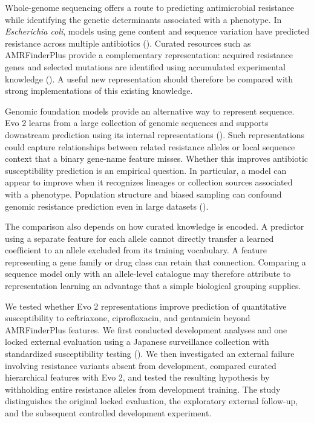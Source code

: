 \documentclass[
  american,
  11pt,
]{article}
\begin{document}
Whole-genome sequencing offers a route to predicting antimicrobial
resistance while identifying the genetic determinants associated with a
phenotype. In \emph{Escherichia coli}, models using gene content and
sequence variation have predicted resistance across multiple antibiotics
(). Curated
resources such as AMRFinderPlus provide a complementary representation:
acquired resistance genes and selected mutations are identified using
accumulated experimental knowledge
(). A useful new
representation should therefore be compared with strong implementations
of this existing knowledge.

Genomic foundation models provide an alternative way to represent
sequence. Evo 2 learns from a large collection of genomic sequences and
supports downstream prediction using its internal representations
(). Such representations
could capture relationships between related resistance alleles or local
sequence context that a binary gene-name feature misses. Whether this
improves antibiotic susceptibility prediction is an empirical question.
In particular, a model can appear to improve when it recognizes lineages
or collection sources associated with a phenotype. Population structure
and biased sampling can confound genomic resistance prediction even in
large datasets ().

The comparison also depends on how curated knowledge is encoded. A
predictor using a separate feature for each allele cannot directly
transfer a learned coefficient to an allele excluded from its training
vocabulary. A feature representing a gene family or drug class can
retain that connection. Comparing a sequence model only with an
allele-level catalogue may therefore attribute to representation
learning an advantage that a simple biological grouping supplies.

We tested whether Evo 2 representations improve prediction of
quantitative susceptibility to ceftriaxone, ciprofloxacin, and
gentamicin beyond AMRFinderPlus features. We first conducted development
analyses and one locked external evaluation using a Japanese
surveillance collection with standardized susceptibility testing
(). We then investigated an
external failure involving resistance variants absent from development,
compared curated hierarchical features with Evo 2, and tested the
resulting hypothesis by withholding entire resistance alleles from
development training. The study distinguishes the original locked
evaluation, the exploratory external follow-up, and the subsequent
controlled development experiment.
\end{document}
